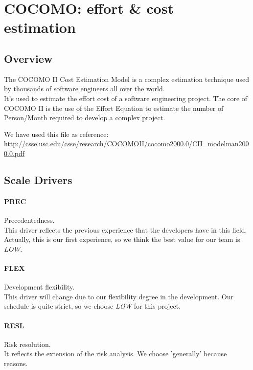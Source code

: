 \section{COCOMO: effort \& cost estimation}
\subsection{Overview} %
\label{sub:cocomo_overview}
The COCOMO II Cost Estimation Model is a complex estimation technique used 
by thousands of software engineers all over the world. \\
It's used to estimate the effort cost of a software engineering project.
The core of COCOMO II is the use of the Effort Equation to estimate the number
of Person/Month required to develop a complex project.

We have used this file as reference: \\ 
\url{http://csse.usc.edu/csse/research/COCOMOII/cocomo2000.0/CII_modelman2000.0.pdf}

\subsection{Scale Drivers} %
\label{sub:scale_drivers}

\paragraph{PREC} Precedentedness. \\ 
This driver reflects the previous experience that the developers have in this 
field. Actually, this is our first experience, so we think the best value for
our team is \emph{LOW}.

\paragraph{FLEX} Development flexibility. \\
This driver will change due to our flexibility degree in the development.
Our schedule is quite strict, so we choose \emph{LOW} for this project.

\paragraph{RESL} Risk resolution. \\
It reflects the extension of the risk analysis. We choose 'generally'
because reasons. %

